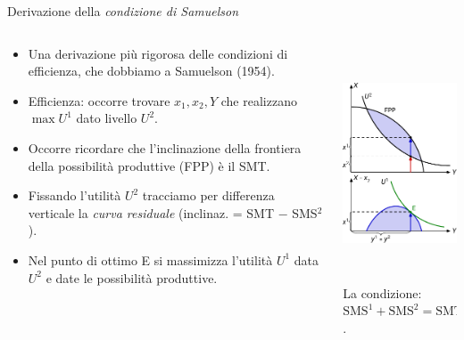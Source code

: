 \documentclass[aspectratio=64,12pt]{beamer}
\begin{document}
\begin{frame}{Derivazione della \emph{condizione di Samuelson}}
\begin{columns}
\begin{column}{.5\columnwidth}
\small
\begin{itemize}
\item Una derivazione più rigorosa delle condizioni di efficienza, che dobbiamo a
Samuelson (1954).
\item Efficienza: occorre trovare $x_{1},x_{2},Y$ che realizzano $\max U^{1}$
dato livello $U^{2}$.
\item Occorre ricordare che l'inclinazione della frontiera della possibilità
produttive (FPP) è il SMT.
\item Fissando l'utilità $U^{2}$ tracciamo per differenza verticale la \emph{curva
residuale} (inclinaz. = SMT $-$ SMS$^2$).
\item Nel punto di ottimo E si massimizza l'utilità $U^{1}$ data $U^{2}$ e date
le possibilità produttive.
\end{itemize}
\end{column}

\begin{column}{.5\columnwidth}
\begin{center}
\includegraphics[height=7cm]{./figure/samuelson-11.pdf}\\
La condizione: $\text{SMS}^{1}+\text{SMS}^{2}=\text{SMT}$.
\end{center} 
\end{column}
\end{columns}
\end{frame}
\end{document}
